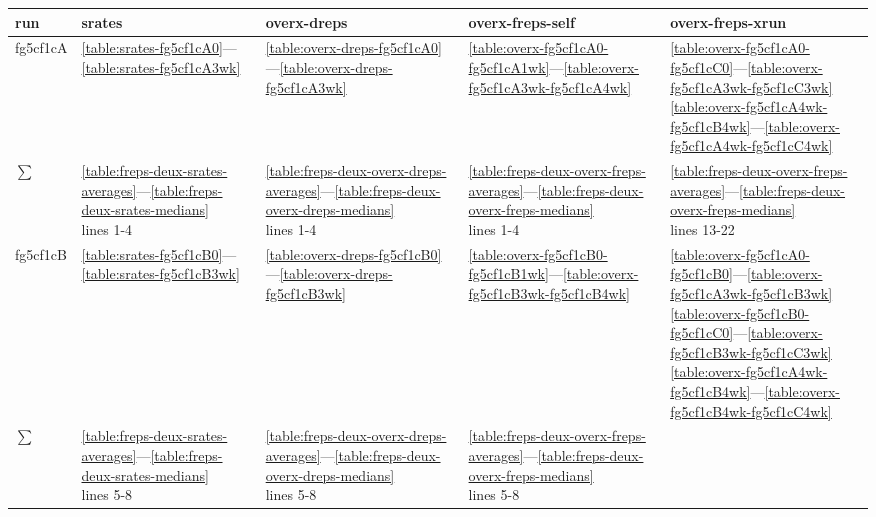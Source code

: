 \begin{table}
\begin{tabular}{|lllll|}
\toprule
run & srates & overx-dreps & overx-freps-self & overx-freps-xrun \\
\midrule
fg5cf1cA & 
\ref{table:srates-fg5cf1cA0}—\ref{table:srates-fg5cf1cA3wk} & 
\ref{table:overx-dreps-fg5cf1cA0}—\ref{table:overx-dreps-fg5cf1cA3wk} & 
\ref{table:overx-fg5cf1cA0-fg5cf1cA1wk}—\ref{table:overx-fg5cf1cA3wk-fg5cf1cA4wk} & 
\parbox[c][2cm]{3cm}{\ref{table:overx-fg5cf1cA0-fg5cf1cC0}—\ref{table:overx-fg5cf1cA3wk-fg5cf1cC3wk} \\ 
            \ref{table:overx-fg5cf1cA4wk-fg5cf1cB4wk}—\ref{table:overx-fg5cf1cA4wk-fg5cf1cC4wk}} \\
$\sum$ &
\parbox[c][2cm]{3cm}{\ref{table:freps-deux-srates-averages}—\ref{table:freps-deux-srates-medians} \\ lines 1-4} & 
\parbox[c][2cm]{3cm}{\ref{table:freps-deux-overx-dreps-averages}—\ref{table:freps-deux-overx-dreps-medians} \\ lines 1-4} & 
\parbox[c][2cm]{3cm}{\ref{table:freps-deux-overx-freps-averages}—\ref{table:freps-deux-overx-freps-medians} \\ lines 1-4} & 
\parbox[c][2cm]{3cm}{\ref{table:freps-deux-overx-freps-averages}—\ref{table:freps-deux-overx-freps-medians} \\ lines 13-22} \\
\hline
fg5cf1cB & 
\ref{table:srates-fg5cf1cB0}—\ref{table:srates-fg5cf1cB3wk} & 
\ref{table:overx-dreps-fg5cf1cB0}—\ref{table:overx-dreps-fg5cf1cB3wk} & 
\ref{table:overx-fg5cf1cB0-fg5cf1cB1wk}—\ref{table:overx-fg5cf1cB3wk-fg5cf1cB4wk} & 
\parbox{3cm}{\ref{table:overx-fg5cf1cA0-fg5cf1cB0}—\ref{table:overx-fg5cf1cA3wk-fg5cf1cB3wk} \\
             \ref{table:overx-fg5cf1cB0-fg5cf1cC0}—\ref{table:overx-fg5cf1cB3wk-fg5cf1cC3wk} \\
             \ref{table:overx-fg5cf1cA4wk-fg5cf1cB4wk}—\ref{table:overx-fg5cf1cB4wk-fg5cf1cC4wk}} \\
$\sum$ & 
\parbox[c][2cm]{3cm}{\ref{table:freps-deux-srates-averages}—\ref{table:freps-deux-srates-medians} \\ lines 5-8} & 
\parbox[c][2cm]{3cm}{\ref{table:freps-deux-overx-dreps-averages}—\ref{table:freps-deux-overx-dreps-medians} \\ lines 5-8} & 
\parbox[c][2cm]{3cm}{\ref{table:freps-deux-overx-freps-averages}—\ref{table:freps-deux-overx-freps-medians} \\ lines 5-8} & 

\end{tabular}
\end{table}
